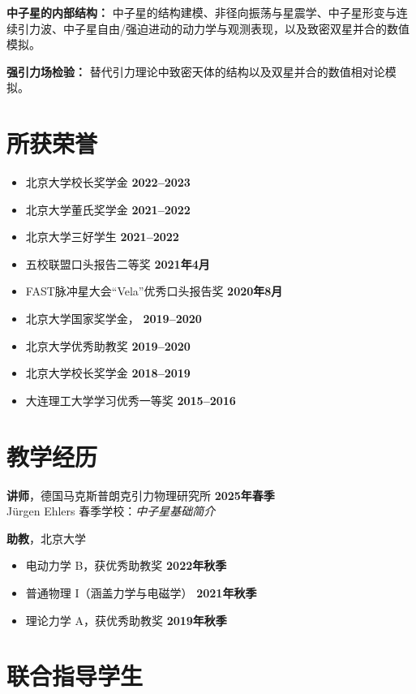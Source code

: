 \documentclass[margin,line]{res_mod}
\begin{document}
\begin{resume}
\textbf{中子星的内部结构：} 中子星的结构建模、非径向振荡与星震学、中子星形变与连续引力波、中子星自由/强迫进动的动力学与观测表现，以及致密双星并合的数值模拟。

\textbf{强引力场检验：} 替代引力理论中致密天体的结构以及双星并合的数值相对论模拟。

\section{所获荣誉}
\begin{itemize}
  \item 北京大学校长奖学金 \hfill \textbf{2022–2023}
  \item 北京大学董氏奖学金 \hfill \textbf{2021–2022}
  \item 北京大学三好学生 \hfill \textbf{2021–2022}
  \item 五校联盟口头报告二等奖 \hfill \textbf{2021年4月}
  \item FAST脉冲星大会“Vela”优秀口头报告奖 \hfill \textbf{2020年8月}
  \item 北京大学国家奖学金， \hfill \textbf{2019–2020}
  \item 北京大学优秀助教奖 \hfill \textbf{2019–2020}
  \item 北京大学校长奖学金 \hfill \textbf{2018–2019}
  \item 大连理工大学学习优秀一等奖 \hfill \textbf{2015–2016}
\end{itemize}


\section{教学经历}

\textbf{讲师}，德国马克斯普朗克引力物理研究所 \hfill \textbf{2025年春季} \\
Jürgen Ehlers 春季学校：\textit{中子星基础简介}

\vspace{0.8em}

\textbf{助教}，北京大学
\begin{itemize}
  \item 电动力学 B，获优秀助教奖 \hfill \textbf{2022年秋季}
  \item 普通物理 I（涵盖力学与电磁学） \hfill \textbf{2021年秋季}
  \item 理论力学 A，获优秀助教奖 \hfill \textbf{2019年秋季}
\end{itemize}



\section{联合指导学生}


\end{resume}
\end{document}
